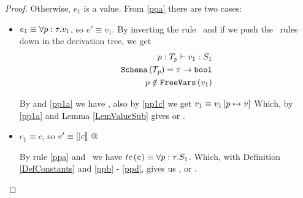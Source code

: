 \begin{proof}
Otherwise, $e_1$ is a value. From \ref{ppa} there are two cases:

\begin{itemize}
\item $e_1 \equiv \forall p : \tau . v_{1}$, so $e' \equiv v_1$.
By inverting the rule \tpgen\ and if we push the \tsub\ rules down in the derivation tree,
we get 
\begin{align}
	{p:T_p}\vdash {v_1}:{S_1} \label{pp1a} \\
	\texttt{Schema}\left(T_p\right) = \tau \rightarrow \texttt{bool} \label{pp1b}\\
	p \notin \texttt{FreeVars}\left(v_1\right) \label{pp1c}
\end{align}

By \wsExt and \ref{pp1a} we have ,
also by \ref{pp1c} we get $v_1 \equiv v_1\left[ p \mapsto v \right]$
Which, by \ref{pp1a} and Lemma \ref{LemValueSub} gives 
 or
.
 
\item $e_1 \equiv c$, 
so $e' \equiv {[|c|]} \ @$
			
			By rule \ref{ppa} and \tcon \ we have 
			$tc\left(\texttt{c}\right) \equiv \forall p : \tau . S_1$.
			Which, with Definition \ref{DefConstants} and \ref{ppb} - \ref{ppd}, gives us 
			, or 
			. 
\end{itemize}
\end{proof}